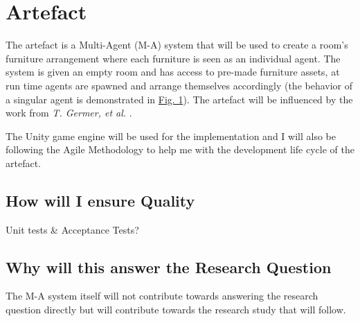 \section{Artefact}

The artefact is a Multi-Agent (M-A) system that will be used to create a room's furniture arrangement where each furniture is seen as an individual agent. The system is given an empty room and has access to pre-made furniture assets, at run time agents are spawned and arrange themselves accordingly (the behavior of a singular agent is demonstrated in \hyperref[activity-diagram]{Fig. 1}). The artefact will be influenced by the work from \textit{T. Germer, et al.} \cite{real-time-walkthroughs}.

The Unity game engine will be used for the implementation \cite{unity} and I will also be following the Agile Methodology to help me with the development life cycle of the artefact.




\subsection{How will I ensure Quality}
Unit tests \& Acceptance Tests?

\subsection{Why will this answer the Research Question}
The M-A system itself will not contribute towards answering the research question directly but will contribute towards the research study that will follow. 

